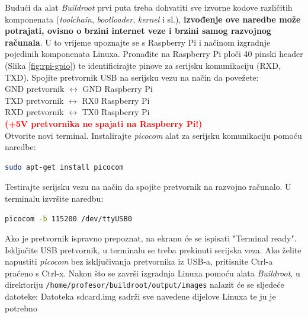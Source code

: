 \documentclass[11pt]{article}
\begin{document}
Budući da alat \textit{Buildroot} prvi puta treba dohvatiti sve izvorne kodove
 različitih komponenata (\textit{toolchain}, \textit{bootloader}, \textit{kernel}
 i sl.), \textbf{izvođenje ove naredbe može potrajati, ovisno o brzini internet
 veze i brzini samog razvojnog računala}. U to vrijeme upoznajte se s Raspberry
 Pi i načinom izgradnje pojedinih komponenata Linuxa.
\newline
\newline
Pronađite na Raspberry Pi ploči 40 pinski header (Slika \ref{fig:rpi-gpio}) te
 identificirajte pinove za serijsku komunikaciju (RXD, TXD). Spojite pretvornik
 USB na serijsku vezu na način da povežete:\\
\newline
GND pretvornik $\leftrightarrow$ GND Raspberry Pi \\
TXD pretvornik $\leftrightarrow$ RX0 Raspberry Pi \\
RXD pretvornik $\leftrightarrow$ TX0 Raspberry Pi \\
\textbf{\textcolor{red}{(+5V pretvornika ne spajati na Raspberry Pi!)}} \\
\newline
Otvorite novi terminal. Instalirajte \textit{picocom} alat za serijsku
 komunikaciju pomoću naredbe:
\begin{lstlisting}[language=bash]
sudo apt-get install picocom
\end{lstlisting}
Testirajte serijsku vezu na način da spojite pretvornik na razvojno računalo. U
 terminalu izvršite naredbu:
\begin{lstlisting}[language=bash]
picocom -b 115200 /dev/ttyUSB0
\end{lstlisting}
Ako je pretvornik ispravno prepoznat, na ekranu će se ispisati "Terminal ready".
 Isključite USB pretvornik, u terminalu se treba prekinuti serijska veza. Ako
 želite napustiti \textit{picocom} bez isključivanja pretvornika iz USB-a,
 pritisnite Ctrl-a praćeno s Ctrl-x.
\newline
\newline
Nakon što se završi izgradnja Linuxa pomoću alata \textit{Buildroot}, u
 direktoriju \texttt{/home/profesor/buildroot/output/images} nalazit će se
 sljedeće datoteke:
\newline
{}%
Datoteka sdcard.img sadrži sve navedene dijelove Linuxa te ju je potrebno
\end{document}
